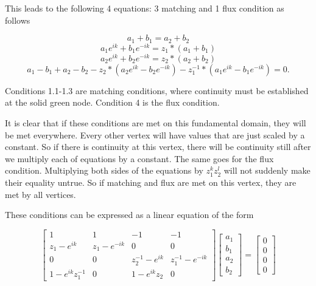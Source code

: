 \documentclass[12pt]{article}
\begin{document}
 This leads to the following 4 equations: 3 matching and 1 flux condition as follows

\begin{equation} 
a_1 + b_1 = a_2 + b_2 
\end{equation}
\begin{equation}
a_1e^{ik} + b_1e^{-ik}= z_1 * (a_1 + b_1)
\end{equation}
\begin{equation}
a_2 e^{ik} + b_2e^{-ik}= z_2 * (a_2 + b_2)
\end{equation}
\begin{equation}
a_1 - b_1 + a_2 - b_2 -  z_2 *(a_2 e^{ik} - b_2e^{-ik}) - z_1^{-1}*(a_1e^{ik} - b_1e^{-ik}) = 0.
\end{equation}

Conditions 1.1-1.3 are matching conditions, where continuity must be established at the solid green node. Condition 4 is the flux condition. 

It is clear that if these conditions are met on this fundamental domain, they will be met everywhere. Every other vertex will have values that are just scaled by a constant. So if there is continuity at this vertex, there will be continuity still after we multiply each of equations by a constant. The same goes for the flux condition. Multiplying both sides of the equations by $z_1^k z_2^l$ will not suddenly make their equality untrue. So if matching and flux are met on this vertex, they are met by all vertices. 

These conditions can be expressed as a linear equation of the form

\begin{equation}
\renewcommand{\arraystretch}{1.3}
\left[
  \begin{array}{cccc}
    1 & 1 & -1 & -1 \\
    z_1-e^{ik} & z_1\!-\!e^{-ik}  & 0 & 0 \\
    0 & 0 & z_2^{-1}\!-\!e^{ik}  & z_1^{-1}\!-\!e^{-ik}  \\
    1\!-\!e^{ik}  z_1^{-1} & 0 & 1\!-\!e^{ik} z_2 & 0
  \end{array}
\right]
\left[
  \begin{array}{c}
    a_1 \\ b_1 \\ a_2 \\ b_2  
  \end{array}
\right]
=
\left[
  \begin{array}{c}
    0 \\ 0 \\ 0 \\ 0
  \end{array}
\right]
\end{equation}
\end{document}
